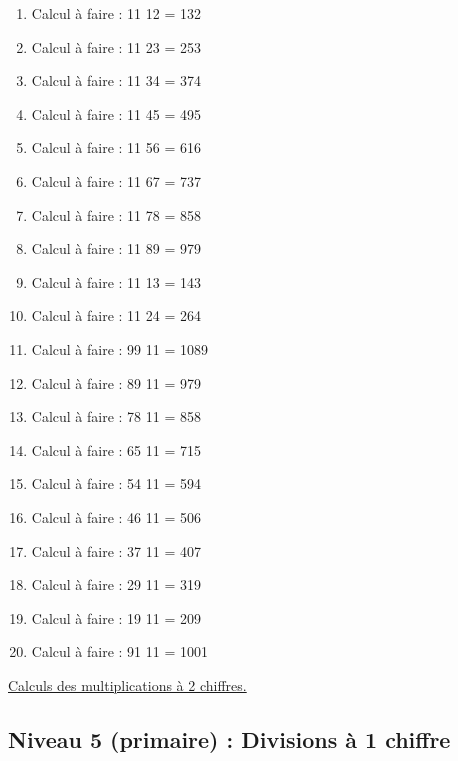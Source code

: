 \documentclass[11pt]{article}
\begin{document}
\begin{enumerate}
\item Calcul à faire :  11\texttimes{} 12 =  132
\item Calcul à faire :  11\texttimes{} 23 = 253
\item Calcul à faire :  11\texttimes{} 34 = 374
\item Calcul à faire :  11\texttimes{} 45 = 495
\item Calcul à faire :  11\texttimes{} 56 = 616
\item Calcul à faire :  11\texttimes{} 67 = 737
\item Calcul à faire :  11\texttimes{} 78 =  858
\item Calcul à faire :  11\texttimes{} 89 = 979
\item Calcul à faire :  11\texttimes{} 13 = 143
\item Calcul à faire :  11\texttimes{} 24 = 264
\item Calcul à faire :  99\texttimes{} 11 = 1089
\item Calcul à faire :  89\texttimes{} 11 = 979
\item Calcul à faire :  78\texttimes{} 11 = 858
\item Calcul à faire :  65\texttimes{} 11 = 715
\item Calcul à faire :  54\texttimes{} 11 = 594
\item Calcul à faire :  46\texttimes{} 11 = 506
\item Calcul à faire :  37\texttimes{} 11 = 407
\item Calcul à faire :  29\texttimes{} 11 = 319
\item Calcul à faire :  19\texttimes{} 11 = 209
\item Calcul à faire :  91\texttimes{} 11 = 1001
\end{enumerate}




\hyperref[org61e7985]{Calculs des multiplications à 2 chiffres.}





\newpage


\subsection{Niveau 5 (primaire) : Divisions à 1 chiffre}
\label{sec:org3726fe4}
\label{org21b00c7}
\end{document}
